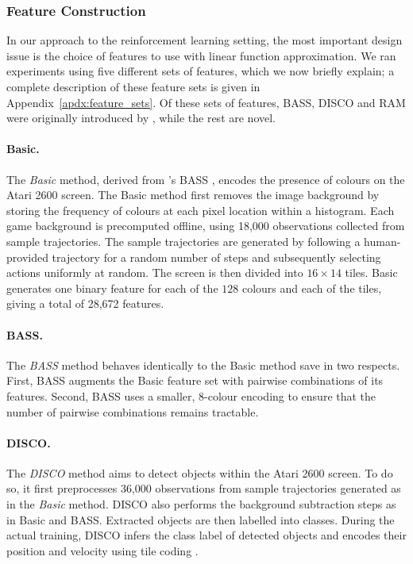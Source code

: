 \documentclass[twoside,11pt]{article}
\begin{document}
\subsubsection{Feature Construction}
In our approach to the reinforcement learning setting, the most important design issue is the choice of features to use with linear function approximation.
We ran experiments using five different sets of features, which we now briefly explain;
a complete description of these feature sets is given in Appendix~\ref{apdx:feature_sets}. Of these
sets of features, BASS, DISCO and RAM were originally introduced by , while the rest are novel.

\paragraph{Basic.}
The \emph{Basic} method, derived from \citeauthor{naddaf2010}'s BASS \citeyear{naddaf2010}, encodes the presence of colours on the Atari 2600 screen.
The Basic method first removes the image background by storing the frequency of colours at each pixel location within a histogram. 
Each game background is precomputed offline, using 18,000 observations collected from sample trajectories. The sample trajectories are generated by following a human-provided trajectory for a random number of steps and subsequently selecting actions uniformly at random.  
The screen is then divided into $16 \times 14$ tiles. 
Basic generates one binary feature for each of the $128$ colours and each of the tiles, giving a total of 28,672 features.

\paragraph{BASS.} The \emph{BASS} method behaves identically to the Basic method save in two respects. First, BASS augments the Basic feature set with pairwise combinations of its features. Second, BASS uses a smaller, 8-colour encoding to ensure that the number of pairwise combinations remains tractable. 

\paragraph{DISCO.} The \emph{DISCO} method aims to detect objects within the Atari 2600 screen. To do so, it first preprocesses 36,000 observations from sample trajectories generated as in the \emph{Basic} method. DISCO also performs the background subtraction steps as in Basic and BASS. Extracted objects are then labelled into classes. During the actual training, DISCO infers the class label of detected objects and encodes their position and velocity using tile coding \cite{sutton_barto_98}.
\end{document}
